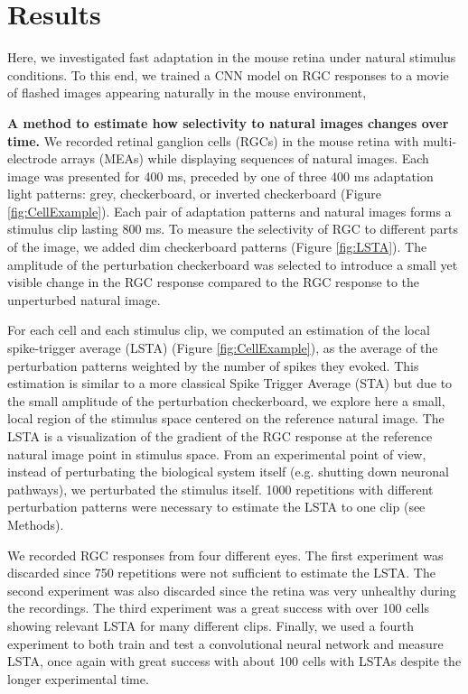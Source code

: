 \section{Results}
\label{sec:results}

Here, we investigated fast adaptation in the mouse retina under natural
stimulus conditions. To this end, we trained a CNN model on RGC responses to a
movie of flashed images appearing naturally in the mouse environment,

\textbf{A method to estimate how selectivity to natural images changes over
    time.}
We recorded retinal ganglion cells (RGCs) in the mouse retina with
multi-electrode arrays (MEAs) while displaying sequences of natural images.
Each image was presented for 400 ms, preceded by one of three 400 ms adaptation
light patterns: grey, checkerboard, or inverted checkerboard (Figure
\ref{fig:CellExample}).
Each pair of adaptation patterns and natural images forms a stimulus clip
lasting 800 ms.
To measure the selectivity of RGC to different parts of the image, we added dim
checkerboard patterns (Figure \ref{fig:LSTA}).
The amplitude of the perturbation checkerboard was selected to introduce a
small yet visible change in the RGC response compared to the RGC response to
the unperturbed natural image.

For each cell and each stimulus clip, we computed an estimation of the local
spike-trigger average (LSTA) (Figure \ref{fig:CellExample}), as the average of
the
perturbation patterns weighted by the number of spikes they evoked. This
estimation is similar to a more classical Spike Trigger Average (STA) but due
to the small amplitude of the perturbation checkerboard, we explore here a
small, local region of the stimulus space centered on the reference natural
image. The LSTA is a visualization of the gradient of the RGC response at the
reference natural image point in stimulus space. From an experimental point of
view, instead of perturbating the biological system itself (e.g. shutting down
neuronal pathways), we perturbated the stimulus itself.
1000 repetitions with different perturbation patterns were necessary to
estimate the LSTA to one clip (see Methods).

We recorded RGC responses from four different eyes. The first experiment was
discarded since 750 repetitions were not sufficient to estimate the LSTA. The
second experiment was also discarded since the retina was very unhealthy during
the recordings. The third experiment was a great success with over 100 cells
showing relevant LSTA for many different clips. Finally, we used a fourth
experiment to both train and test a convolutional neural network and measure
LSTA, once again with
great success with about 100 cells with LSTAs despite the longer experimental
time.

